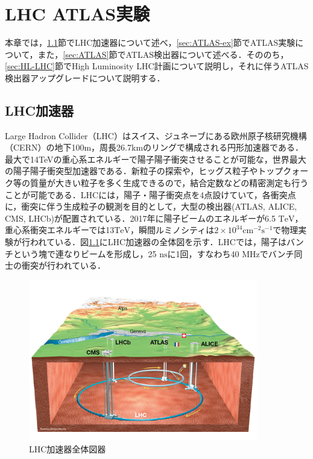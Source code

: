 \chapter{LHC ATLAS実験}
本章では，\ref{sec:LHC}節でLHC加速器について述べ，\ref{sec:ATLAS-ex}節でATLAS実験について，また，\ref{sec:ATLAS}節でATLAS検出器について述べる．そののち，\ref{sec:HL-LHC}節でHigh Luminosity LHC計画について説明し，それに伴うATLAS検出器アップグレードについて説明する．\par
\section{LHC加速器}
\label{sec:LHC}
Large Hadron Collider（LHC）はスイス、ジュネーブにある欧州原子核研究機構（CERN）の地下100m，周長26.7kmのリングで構成される円形加速器である．最大で14TeVの重心系エネルギーで陽子陽子衝突させることが可能な，世界最大の陽子陽子衝突型加速器である．新粒子の探索や，ヒッグス粒子やトップクォーク等の質量が大きい粒子を多く生成できるので，結合定数などの精密測定も行うことが可能である．LHCには，陽子・陽子衝突点を4点設けていて，各衝突点に，衝突に伴う生成粒子の観測を目的として，大型の検出器(ATLAS, ALICE, CMS, LHCb)が配置されている．2017年に陽子ビームのエネルギーが6.5 $\mathrm{TeV}$，重心系衝突エネルギーでは13$\mathrm{TeV}$，瞬間ルミノシティは$2\times 10^34 \mathrm{cm^{-2}s^{-1}}$で物理実験が行われている．図\ref{fig:LHC}にLHC加速器の全体図を示す．LHCでは，陽子はバンチという塊で連なりビームを形成し，25 $\mathrm{ns}$に1回，すなわち40 $\mathrm{MHz}$でバンチ同士の衝突が行われている．\par

\begin{figure}
  \centering
  \includegraphics[width=10cm]{./figure/LHC.png}
  \caption{LHC加速器全体図器\cite{Collaboration_2008}}
  \label{fig:LHC}
\end{figure}



